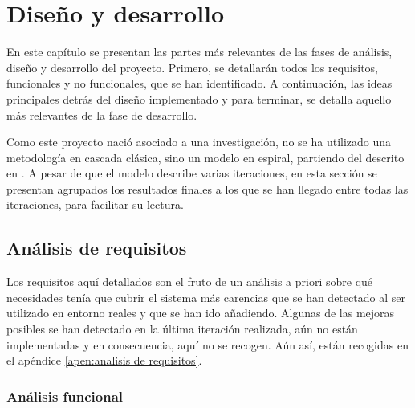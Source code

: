 \chapter{Diseño y desarrollo\label{sec:disenhoYDesarrollo}}


%

En este capítulo se presentan las partes más relevantes de las fases de análisis, diseño y desarrollo del proyecto. Primero, se detallarán todos los requisitos, funcionales y no funcionales, que se han identificado. A continuación, las ideas principales detrás del diseño implementado y para terminar, se detalla aquello más relevantes de la fase de desarrollo.

Como este proyecto nació asociado a una investigación, no se ha utilizado una metodología en cascada clásica, sino un modelo en espiral, partiendo del descrito en \cite{Boehm86}. A pesar de que el modelo describe varias iteraciones, en esta sección se presentan agrupados los resultados finales a los que se han llegado entre todas las iteraciones, para facilitar su lectura.


\section{Análisis de requisitos}

Los requisitos aquí detallados son el fruto de un análisis a priori sobre qué necesidades tenía que cubrir el sistema más carencias que se han detectado al ser utilizado en entorno reales y que se han ido añadiendo. Algunas de las mejoras posibles se han detectado en la última iteración realizada, aún no están implementadas y en consecuencia, aquí no se recogen. Aún así, están recogidas en el apéndice \ref{apen:analisis de requisitos}. 

\subsection{Análisis funcional}

